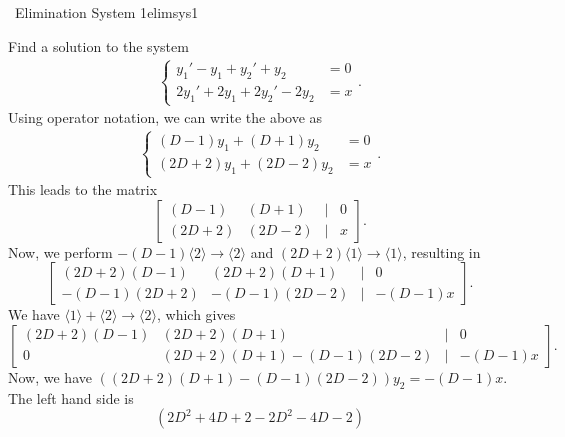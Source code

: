     \begin{example}{\Difficulty\,\Difficulty\,\,Elimination System 1}{elimsys1}

        Find a solution to the system
        \begin{align*}
            \begin{cases}
                y_1'-y_1+y_2'+y_2&=0 \\
                2y_1'+2y_1+2y_2'-2y_2&=x
            \end{cases}.
        \end{align*}
        Using operator notation, we can write the above as
        \begin{align*}
            \begin{cases}
                (D-1)y_1+(D+1)y_2&=0 \\
                (2D+2)y_1+(2D-2)y_2&=x
            \end{cases}.
        \end{align*}
        This leads to the matrix
        \begin{equation*}
            \begin{bmatrix}
                (D-1)& (D+1) & | & 0 \\
                (2D+2)& (2D-2) & | & x
            \end{bmatrix}.
        \end{equation*}
        Now, we perform \(-(D-1)\langle 2\rangle\to\langle2\rangle\) and \((2D+2)\langle1\rangle\to\langle1\rangle\), resulting in
        \begin{equation*}
            \begin{bmatrix}
                (2D+2)(D-1)& (2D+2)(D+1) & | & 0 \\
                -(D-1)(2D+2)& -(D-1)(2D-2) & | & -(D-1)x
            \end{bmatrix}.
        \end{equation*}
        We have \(\langle1\rangle+\langle2\rangle\to\langle2\rangle\), which gives
        \begin{equation*}
            \begin{bmatrix}
                (2D+2)(D-1)& (2D+2)(D+1) & | & 0 \\
                0 & (2D+2)(D+1)-(D-1)(2D-2) & | & -(D-1)x
            \end{bmatrix}.
        \end{equation*}
        Now, we have \(((2D+2)(D+1)-(D-1)(2D-2))y_2=-(D-1)x\). The left hand side is
        \begin{equation*}
            (2D^2+4D+2-2D^2-4D-2)
        \end{equation*}        
    \end{example}

